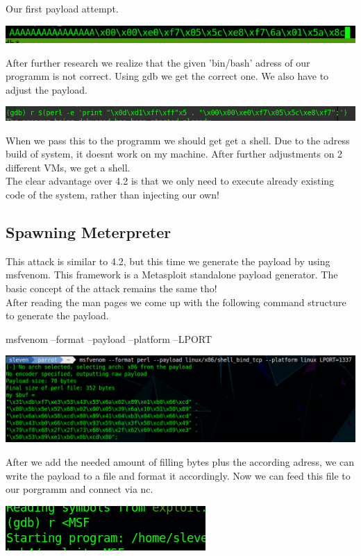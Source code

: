 \documentclass[a4paper,10pt]{article}
\begin{document}
Our first payload attempt.
\begin{center}
\includegraphics[scale=0.5]{pay.png} 
\end{center}
After further research we realize that the given 'bin/bash' adress of our programm is not correct. Using gdb we get the correct one. We also have to adjust the payload.
\begin{center}
 \includegraphics[scale=0.5]{pay3.png}
\end{center}
When we pass this to the programm we should get get a shell. Due to the adress build of system, it doesnt work on my machine. After further adjustments on 2 different VMs, we get a shell.\\
The clear advantage over 4.2 is that we only need to execute already existing code of the system, rather than injecting our own!
\newpage
\subsection{Spawning Meterpreter}
This attack is similar to 4.2, but this time we generate the payload by using msfvenom. This framework is a Metasploit standalone payload generator. The basic concept of the attack remains the same tho!\\
After reading the man pages we come up with the following command structure to generate the payload.\
\begin{center}
 msfvenom --format --payload --platform --LPORT 
\end{center}
\begin{center}
 \includegraphics[scale=0.4]{pay4.png}
\end{center}
After we add the needed amount of filling bytes plus the according adress, we can write the payload to a file and format it accordingly. Now we can feed this file to our porgramm and connect via nc.
\begin{center}
 \includegraphics[scale=0.5]{pay6.png}
\end{center}
\end{document}
